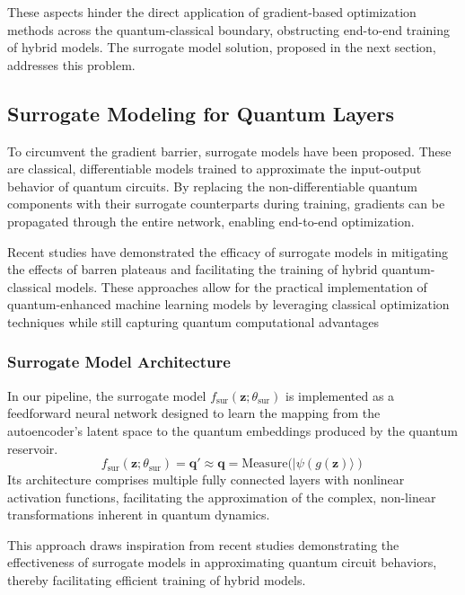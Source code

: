 \documentclass[conference]{IEEEtran}
\begin{document}
These aspects hinder the direct application of 
gradient-based optimization methods across the 
quantum-classical boundary, obstructing end-to-end 
training of hybrid models. The surrogate model 
solution, proposed in the next section, addresses 
this problem.


\subsection{Surrogate Modeling for Quantum Layers}
To circumvent the gradient barrier, surrogate models 
have been proposed. These are classical, differentiable 
models trained to approximate the input-output behavior 
of quantum circuits. By replacing the non-differentiable 
quantum components with their surrogate counterparts during 
training, gradients can be propagated through the entire network, 
enabling end-to-end optimization. 

Recent studies have demonstrated the efficacy of 
surrogate models in mitigating the effects of barren plateaus 
and facilitating the training of hybrid quantum-classical models. 
These approaches allow for the practical implementation of 
quantum-enhanced machine learning models by leveraging classical 
optimization techniques while still capturing quantum computational 
advantages~\cite{xieQuantumSurrogateDrivenImage2025b}


\subsubsection{Surrogate Model Architecture}
In our pipeline, the surrogate model \( f_{\text{sur}}(\mathbf{z}; \theta_{\text{sur}}) \) is implemented as a feedforward neural network designed to learn the mapping from the autoencoder's latent space to the quantum embeddings produced by the quantum reservoir. 
\begin{equation}
    f_{\text{sur}}(\mathbf{z}; \theta_{\text{sur}}) = \mathbf{q}' \approx \mathbf{q} = \mathrm{Measure}(|\psi(g(\mathbf{z})\rangle)
\end{equation}
Its architecture comprises multiple fully connected 
layers with nonlinear activation functions, facilitating 
the approximation of the complex, non-linear 
transformations inherent in quantum dynamics.

This approach draws inspiration from recent studies 
demonstrating the effectiveness of surrogate models 
in approximating quantum circuit behaviors, thereby 
facilitating efficient training of hybrid 
models.~\cite{xieQuantumSurrogateDrivenImage2025b,schreiberClassicalSurrogatesQuantum2023}
\end{document}
